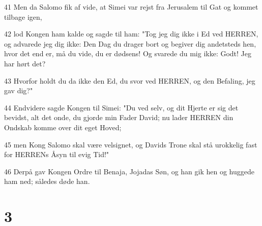 \par 41 Men da Salomo fik af vide, at Simei var rejst fra Jerusalem til Gat og kommet tilbage igen,
\par 42 lod Kongen ham kalde og sagde til ham: "Tog jeg dig ikke i Ed ved HERREN, og advarede jeg dig ikke: Den Dag du drager bort og begiver dig andetsteds hen, hvor det end er, må du vide, du er dødsens! Og svarede du mig ikke: Godt! Jeg har hørt det?
\par 43 Hvorfor holdt du da ikke den Ed, du svor ved HERREN, og den Befaling, jeg gav dig?"
\par 44 Endvidere sagde Kongen til Simei: "Du ved selv, og dit Hjerte er sig det bevidst, alt det onde, du gjorde min Fader David; nu lader HERREN din Ondskab komme over dit eget Hoved;
\par 45 men Kong Salomo skal være velsignet, og Davids Trone skal stå urokkelig fast for HERRENs Åsyn til evig Tid!"
\par 46 Derpå gav Kongen Ordre til Benaja, Jojadas Søn, og han gik hen og huggede ham ned; således døde han.

\chapter{3}

